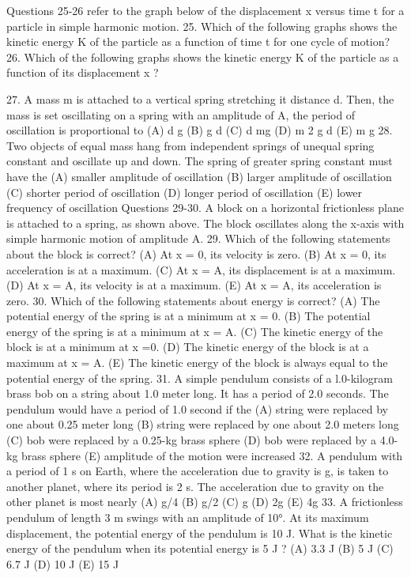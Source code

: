 Questions 25-26 refer to the graph below of the displacement x versus time t for a particle in simple harmonic
motion.
25. Which of the following graphs shows the kinetic energy K of the particle as a function of time t for one cycle of
motion?
26. Which of the following graphs shows the kinetic energy K of the particle as a function of its displacement x ?



27. A mass m is attached to a vertical spring stretching it distance d. Then, the mass is set oscillating on a spring
with an amplitude of A, the period of oscillation is proportional to
(A)
d
g
(B)
g
d
(C)
d
mg
(D)
m 2 g
d
(E)
m
g
28. Two objects of equal mass hang from independent springs of unequal spring constant and oscillate up and down.
The spring of greater spring constant must have the
(A) smaller amplitude of oscillation
(B) larger amplitude of oscillation
(C) shorter period of oscillation
(D) longer period of oscillation
(E) lower frequency of oscillation
Questions 29-30. A block on a horizontal frictionless plane is attached to a spring, as shown above. The block
oscillates along the x-axis with simple harmonic motion of amplitude A.
29. Which of the following statements about the block is correct?
(A) At x = 0, its velocity is zero.
(B) At x = 0, its acceleration is at a maximum.
(C) At x = A, its displacement is at a maximum.
(D) At x = A, its velocity is at a maximum.
(E) At x = A, its acceleration is zero.
30. Which of the following statements about energy is correct?
(A) The potential energy of the spring is at a minimum at x = 0.
(B) The potential energy of the spring is at a minimum at x = A.
(C) The kinetic energy of the block is at a minimum at x =0.
(D) The kinetic energy of the block is at a maximum at x = A.
(E) The kinetic energy of the block is always equal to the potential energy of the spring.
31. A simple pendulum consists of a l.0-kilogram brass bob on a string about 1.0 meter long. It has a period of 2.0
seconds. The pendulum would have a period of 1.0 second if the
(A) string were replaced by one about 0.25 meter long
(B) string were replaced by one about 2.0 meters long
(C) bob were replaced by a 0.25-kg brass sphere
(D) bob were replaced by a 4.0-kg brass sphere
(E) amplitude of the motion were increased
32. A pendulum with a period of 1 s on Earth, where the acceleration due to gravity is g, is taken to another planet,
where its period is 2 s. The acceleration due to gravity on the other planet is most nearly
(A) g/4
(B) g/2
(C) g
(D) 2g
(E) 4g
33. A frictionless pendulum of length 3 m swings with an amplitude of 10°. At its maximum displacement, the
potential energy of the pendulum is 10 J. What is the kinetic energy of the pendulum when its potential energy
is 5 J ?
(A) 3.3 J
(B) 5 J
(C) 6.7 J
(D) 10 J
(E) 15 J



